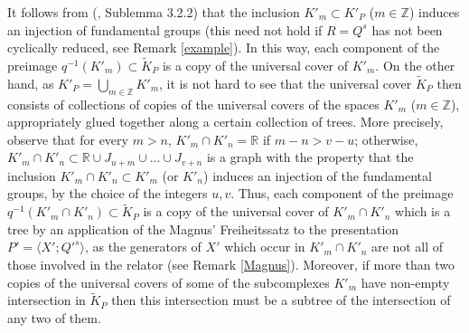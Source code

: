 \documentclass{amsart}[12pt]
\theoremstyle{definition}
\theoremstyle{remark}
\numberwithin{equation}{section}
\begin{document}
 It follows from (\cite{DV}, Sublemma 3.2.2) that
the inclusion $K'_m {\subset} K'_P$ ($m \in {\mathbb Z}$) induces an injection
of fundamental groups (this need not hold if $R=Q^s$ has not been
cyclically reduced, see Remark \ref{example}). In this way, each
component of the pre\-image $q^{-1}(K'_m) {\subset} \widetilde{K}_P$ is
a copy of the universal cover of $K'_m$. On the other hand, as
$K'_P = \displaystyle \bigcup_{m \in {\mathbb Z}} K'_m$, it is not hard
to see that the universal cover $\widetilde{K}_P$ then consists of
collections of copies of the universal covers of the spaces $K'_m$
($m \in {\mathbb Z}$), appropriately glued together along a certain
collection of trees. More precisely, observe that for e\-ve\-ry $m
> n$, $K'_m \cap K'_n = {\mathbb R}$ if $m-n > v-u$; otherwise, $K'_m
\cap K'_n {\subset} {\mathbb R} \cup J_{u+m} \cup \dots \cup J_{v+n}$ is a
graph with the property that the inclusion $K'_m \cap K'_n {\subset}
K'_m$ (or $K'_n$) induces an injection of the fundamental groups,
by the choice of the integers $u,v$. Thus, each component of the
preimage $q^{-1}(K'_m \cap K'_n) {\subset} \widetilde{K}_P$ is a copy
of the universal cover of $K'_m \cap K'_n$ which is a tree by an
application of the Magnus' Freiheitssatz to the presentation $P' =
\langle X';{Q'}^s \rangle$, as the generators of $X'$ which occur
in $K'_m \cap K'_n$ are not all of those involved in the relator
(see Remark \ref{Magnus}). Moreover, if more than two copies of
the universal covers of some of the subcomplexes $K'_m$ have
non-empty intersection in $\widetilde{K}_P$ then this intersection
must be a subtree of the intersection of any two of them.\\
\end{document}
